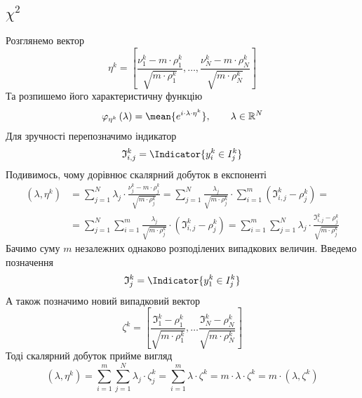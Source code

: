 \subsection{$\chi^2$}
Розглянемо вектор
\begin{equation*}
    \eta^k
    = \left[ \frac{\nu_1^k - m \cdot \rho_1^k}{\sqrt{m \cdot \rho_1^k}}, \dots,
      \frac{\nu_N^k - m \cdot \rho_N^k}{\sqrt{m \cdot \rho_N^k}} \right]
\end{equation*}
Та розпишемо його характеристичну функцію
\begin{equation*}
  \varphi_{\eta^k}\left( \lambda\right)
  = \mean{e^{i \cdot \lambda \cdot \eta^k}},\qquad
  \lambda \in \mathbb{R}^N
\end{equation*}
Для зручності перепозначимо індикатор
\begin{equation*}
  \mathfrak{I}_{i,j}^k = \Indicator{y_i^k \in I_j^k}
\end{equation*}
Подивимось, чому дорівнює скалярний добуток в експоненті
\begin{equation*}
  \begin{split}
    \left( \lambda, \eta^k \right)
    &= \sum_{j=1}^{N} \lambda_j \cdot \frac{\nu_j^k - m \cdot \rho_j^k}{
      \sqrt{m \cdot \rho_j^k}}
    = \sum_{j=1}^{N}\frac{\lambda_j}{\sqrt{m \cdot \rho_j^k}}
      \cdot \sum_{i=1}^{m}\left( \mathfrak{I}_{i,j}^k - \rho_j^k \right) = \\
    &= \sum_{j=1}^{N} \sum_{i=1}^{m}
      \frac{\lambda_j}{\sqrt{m \cdot \rho_j^k}}
      \cdot \left( \mathfrak{I}_{i,j}^k - \rho_j^k \right)
    = \sum_{i=1}^{m} \sum_{j=1}^{N} \lambda_j \cdot
      \frac{\mathfrak{I}_{i,j}^k - \rho_j^k}{\sqrt{m \cdot \rho_j^k}}
  \end{split}
\end{equation*}
Бачимо суму $m$ незалежних однаково розподілених випадкових величин.
Введемо позначення
\begin{equation*}
  \mathfrak{I}_j^k = \Indicator{y_1^k \in I_j^k}
\end{equation*}
А також позначимо новий випадковий вектор
\begin{equation*}
  \zeta^k
  = \left[ \frac{\mathfrak{I}_1^k - \rho_1^k}{\sqrt{m \cdot \rho_1^k}},
    \dots
    \frac{\mathfrak{I}_N^k - \rho_N^k}{\sqrt{m \cdot \rho_N^k}} \right]
\end{equation*}
Тоді скалярний добуток прийме вигляд
\begin{equation*}
    \left( \lambda, \eta^k \right)
    = \sum_{i=1}^{m} \sum_{j=1}^{N} \lambda_j \cdot \zeta_j^k
    = \sum_{i=1}^{m} \lambda \cdot \zeta^k
    = m \cdot \lambda \cdot \zeta^k
    = m \cdot \left( \lambda, \zeta^k \right)
\end{equation*}
